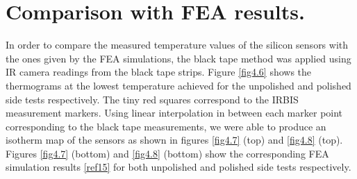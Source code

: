 	\section{Comparison with FEA results.}\label{section4.4}	
	
		In order to compare the measured temperature values of the silicon sensors with the ones given by the FEA simulations, the black tape method was applied using IR camera readings from the black tape strips. Figure \ref{fig4.6} shows the thermograms at the lowest temperature achieved for the unpolished and polished side tests respectively. The tiny red squares correspond to the IRBIS measurement markers. Using linear interpolation in between each marker point corresponding to the black tape measurements, we were able to produce an isotherm map of the sensors as shown in figures \ref{fig4.7} (top) and \ref{fig4.8} (top). Figures \ref{fig4.7} (bottom) and \ref{fig4.8} (bottom) show the corresponding FEA simulation results \ref{ref15} for both unpolished and polished side tests respectively.
		

